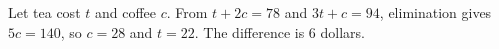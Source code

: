 Let tea cost $t$ and coffee $c$. From $t+2c=78$ and $3t+c=94$, elimination gives $5c=140$, so $c=28$ and $t=22$. The difference is $\boxed6$ dollars.
